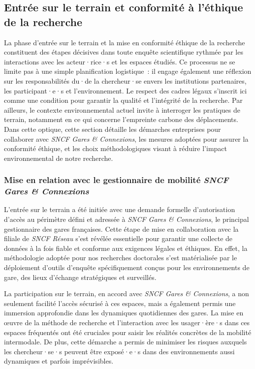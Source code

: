 \begin{refsegment}
\subsection{Entrée sur le terrain et conformité à l'éthique de la recherche
    \label{chap3:preparation-terrain-geographique}
    }

La phase d'entrée sur le terrain et la mise en conformité éthique de la recherche constituent des étapes décisives dans toute enquête scientifique rythmée par les interactions avec les acteur·rice·s et les espaces étudiés. Ce processus ne se limite pas à une simple planification logistique~: il engage également une réflexion sur les responsabilités du·de la chercheur·se envers les institutions partenaires, les participant·e·s et l'environnement. Le respect des cadres légaux s’inscrit ici comme une condition pour garantir la qualité et l’intégrité de la recherche. Par ailleurs, le contexte environnemental actuel invite à interroger les pratiques de terrain, notamment en ce qui concerne l’empreinte carbone des déplacements. Dans cette optique, cette section détaille les démarches entreprises pour collaborer avec \textsl{SNCF Gares \& Connexions}, les mesures adoptées pour assurer la conformité éthique, et les choix méthodologiques visant à réduire l'impact environnemental de notre recherche.%

\subsubsection*{Mise en relation avec le gestionnaire de mobilité \textsl{SNCF Gares \& Connexions}
    \label{chap3:accord-sncf}
    }

L'entrée sur le terrain a été initiée avec une demande formelle d'autorisation d'accès au périmètre défini et adressée à \textsl{SNCF Gares \& Connexions}, le principal gestionnaire des gares françaises. Cette étape de mise en collaboration avec la filiale de \textsl{SNCF Réseau} s'est révélée essentielle pour garantir une collecte de données à la fois fiable et conforme aux exigences légales et éthiques. En effet, la méthodologie adoptée pour nos recherches doctorales s'est matérialisée par le déploiement d'outils d'enquête spécifiquement conçus pour les environnements de gare, des lieux d'échange stratégiques et surveillés.%

La participation sur le terrain, en accord avec \textsl{SNCF Gares \& Connexions}, a non seulement facilité l'accès sécurisé à ces espaces, mais a également permis une immersion approfondie dans les dynamiques quotidiennes des gares. La mise en œuvre de la méthode de recherche et l'interaction avec les usager·ère·s dans ces espaces fréquentés ont été cruciales pour saisir les réalités concrètes de la mobilité intermodale. De plus, cette démarche a permis de minimiser les risques auxquels les chercheur·se·s peuvent être exposé·e·s dans des environnements aussi dynamiques et parfois imprévisibles.%


\end{refsegment}
